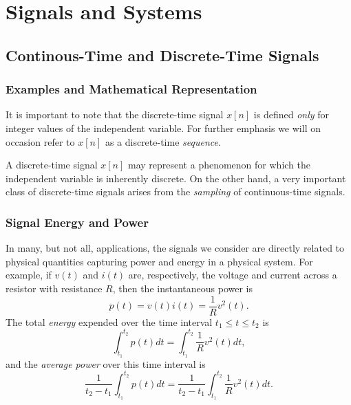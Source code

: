 \documentclass[a4paper,10pt,twoside]{book}
\begin{document}

\restoregeometry
\thispagestyle{empty}
\setcounter{page}{0}
\tableofcontents
\thispagestyle{empty}
\setcounter{page}{0}

\chapter{Signals and Systems}
\label{chapter:1}

\section{Continous-Time and Discrete-Time Signals}
\subsection{Examples and Mathematical Representation}

It is important to note that the discrete-time signal $x[n]$ is defined \textit{only} for integer values of the independent variable. For further emphasis we will on occasion refer to $x[n]$ as a discrete-time \textit{sequence}.

A discrete-time signal $x[n]$ may represent a phenomenon for which the independent variable is inherently discrete. On the other hand, a very important class of discrete-time signals arises from the \textit{sampling} of continuous-time signals.

\subsection{Signal Energy and Power}

In many, but not all, applications, the signals we consider are directly related to physical quantities capturing power and energy in a physical system. For example, if $v(t)$ and $i(t)$ are, respectively, the voltage and current across a resistor with resistance $R$, then the instantaneous power is
\begin{equation}
    p(t)=v(t)i(t)=\dfrac{1}{R}v^2(t).
    \label{1.1}
\end{equation}
The total \textit{energy} expended over the time interval $t_1\le t\le t_2$ is
\begin{equation}
    \int_{t_{1}}^{t_{2}}p(t) dt = \int_{t_{1}}^{t_{2}}\frac{1}{R}v^{2}(t) dt,
    \label{1.2}
\end{equation}
and the \textit{average power} over this time interval is
\begin{equation}
    \frac{1}{t_{2}-t_{1}}\int_{t_{1}}^{t_{2}}p(t) dt = \frac{1}{t_{2}-t_{1}}\int_{t_{1}}^{t_{2}}\frac{1}{R}v^{2}(t) dt.
\end{equation}
\end{document}
